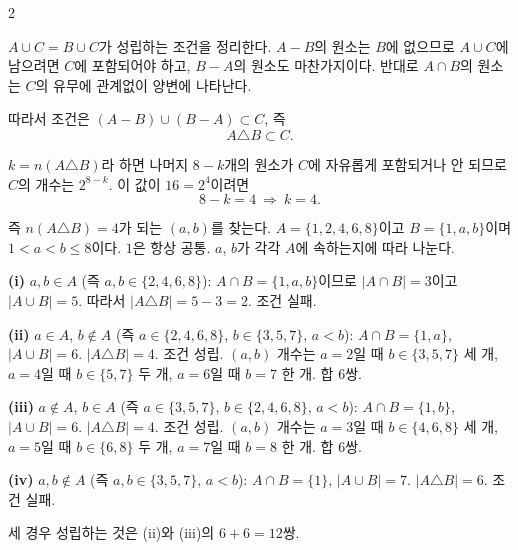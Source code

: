 \documentclass[10pt,fleqn]{article}
\renewcommand{\solpart}[1]{%
  \par\addvspace{10pt}\noindent
  {\sffamily\bfseries\color{black}(#1)}\hspace{3mm}\ignorespaces%
}
\begin{document}
\begin{multicols}{2}

$A \cup C = B \cup C$가 성립하는 조건을 정리한다. $A - B$의 원소는 $B$에 없으므로 $A \cup C$에 남으려면 $C$에 포함되어야 하고, $B - A$의 원소도 마찬가지이다. 반대로 $A \cap B$의 원소는 $C$의 유무에 관계없이 양변에 나타난다.

따라서 조건은 $(A - B) \cup (B - A) \subset C$, 즉
\[ A \triangle B \subset C. \]

$k = n(A \triangle B)$라 하면 나머지 $8 - k$개의 원소가 $C$에 자유롭게 포함되거나 안 되므로 $C$의 개수는 $2^{8 - k}$. 이 값이 $16 = 2^{4}$이려면
\[ 8 - k = 4 \ \Longrightarrow\ k = 4. \]

즉 $n(A \triangle B) = 4$가 되는 $(a, b)$를 찾는다. $A = \{1, 2, 4, 6, 8\}$이고 $B = \{1, a, b\}$이며 $1 < a < b \le 8$이다. $1$은 항상 공통. $a$, $b$가 각각 $A$에 속하는지에 따라 나눈다.

\solpart{i} $a, b \in A$ (즉 $a, b \in \{2, 4, 6, 8\}$): $A \cap B = \{1, a, b\}$이므로 $|A \cap B| = 3$이고 $|A \cup B| = 5$. 따라서 $|A \triangle B| = 5 - 3 = 2$. 조건 실패.

\solpart{ii} $a \in A$, $b \notin A$ (즉 $a \in \{2, 4, 6, 8\}$, $b \in \{3, 5, 7\}$, $a < b$): $A \cap B = \{1, a\}$, $|A \cup B| = 6$. $|A \triangle B| = 4$. 조건 성립. $(a, b)$ 개수는 $a = 2$일 때 $b \in \{3, 5, 7\}$ 세 개, $a = 4$일 때 $b \in \{5, 7\}$ 두 개, $a = 6$일 때 $b = 7$ 한 개. 합 $6$쌍.

\solpart{iii} $a \notin A$, $b \in A$ (즉 $a \in \{3, 5, 7\}$, $b \in \{2, 4, 6, 8\}$, $a < b$): $A \cap B = \{1, b\}$, $|A \cup B| = 6$. $|A \triangle B| = 4$. 조건 성립. $(a, b)$ 개수는 $a = 3$일 때 $b \in \{4, 6, 8\}$ 세 개, $a = 5$일 때 $b \in \{6, 8\}$ 두 개, $a = 7$일 때 $b = 8$ 한 개. 합 $6$쌍.

\solpart{iv} $a, b \notin A$ (즉 $a, b \in \{3, 5, 7\}$, $a < b$): $A \cap B = \{1\}$, $|A \cup B| = 7$. $|A \triangle B| = 6$. 조건 실패.

세 경우 성립하는 것은 (ii)와 (iii)의 $6 + 6 = 12$쌍.



\end{multicols}
\end{document}
